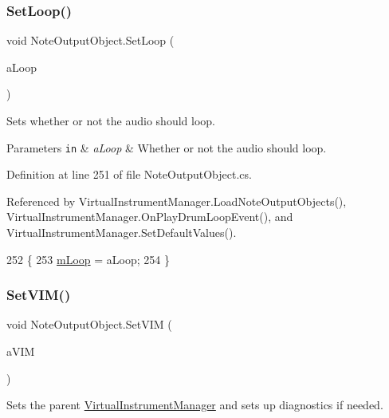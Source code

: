 \subsubsection{\texorpdfstring{Set\+Loop()}{SetLoop()}}
{\footnotesize\ttfamily void Note\+Output\+Object.\+Set\+Loop (\begin{DoxyParamCaption}\item[{bool}]{a\+Loop }\end{DoxyParamCaption})}



Sets whether or not the audio should loop. 


\begin{DoxyParams}[1]{Parameters}
\mbox{\tt in}  & {\em a\+Loop} & Whether or not the audio should loop. \\
\hline
\end{DoxyParams}


Definition at line 251 of file Note\+Output\+Object.\+cs.



Referenced by Virtual\+Instrument\+Manager.\+Load\+Note\+Output\+Objects(), Virtual\+Instrument\+Manager.\+On\+Play\+Drum\+Loop\+Event(), and Virtual\+Instrument\+Manager.\+Set\+Default\+Values().


\begin{DoxyCode}
252     \{
253         \hyperlink{group___n_o_o_priv_var_gabf1d5013f44773e9fd3e4dbb59d74aeb}{mLoop} = aLoop;
254     \}
\end{DoxyCode}
\mbox{\label{group___n_o_o_pub_func_gaca261a6f8d95fc7f81bbc3c8108bad58}} 
\subsubsection{\texorpdfstring{Set\+V\+I\+M()}{SetVIM()}}
{\footnotesize\ttfamily void Note\+Output\+Object.\+Set\+V\+IM (\begin{DoxyParamCaption}\item[{\hyperlink{class_virtual_instrument_manager}{Virtual\+Instrument\+Manager}}]{a\+V\+IM }\end{DoxyParamCaption})}



Sets the parent \hyperlink{class_virtual_instrument_manager}{Virtual\+Instrument\+Manager} and sets up diagnostics if needed. 


